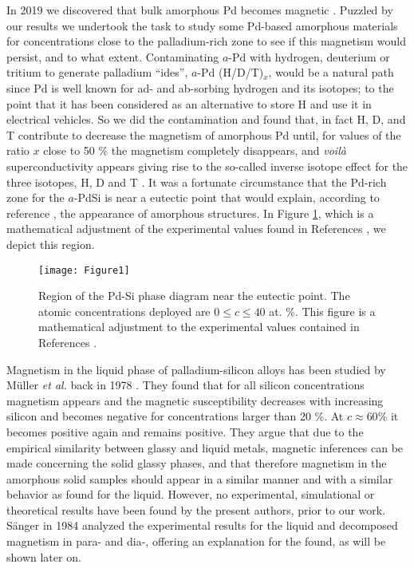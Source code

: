 \documentclass[fleqn,12pt]{wlscirep}
\begin{document}
In 2019 we discovered that bulk amorphous Pd becomes magnetic \cite{Rodriguez_2019}. Puzzled by our results we undertook the task to study some Pd-based amorphous materials for concentrations close to the palladium-rich zone to see if this magnetism would persist, and to what extent. Contaminating $a$-Pd with hydrogen, deuterium or tritium to generate palladium ``ides'', $a$-Pd (H/D/T)$_{x}$, would be a natural path since Pd is well known for ad- and ab-sorbing hydrogen and its isotopes; to the point that it has been considered as an alternative to store H and use it in electrical vehicles. So we did the contamination and found that, in fact H, D, and T contribute to decrease the magnetism of amorphous Pd until, for values of the ratio $x$ close to 50 \% the magnetism completely disappears, and \textit{voilà} superconductivity appears giving rise to the so-called inverse isotope effect for the three isotopes, H, D and T \cite{Rodriguez_supercond_2021}. It was a fortunate circumstance that the Pd-rich zone for the $a$-PdSi is near a eutectic point that would explain, according to reference \cite{Cohen_1961}, the appearance of amorphous structures. In Figure \ref{fig:Fig1}, which is a mathematical adjustment of the experimental values found in References \cite{Okamoto_1993, Baxi_1991, Massara_1993}, we depict this region.

\begin{figure}[ht]
\centering
\texttt{[image: Figure1]}
\caption{Region of the Pd-Si phase diagram near the eutectic point. The atomic concentrations deployed are $0 \leq c \leq 40$ at. \%. This figure is a mathematical adjustment to the experimental values contained in References \cite{Okamoto_1993, Baxi_1991, Massara_1993}.}
\label{fig:Fig1}
\end{figure}

Magnetism in the liquid phase of palladium-silicon alloys has been studied by M\"{u}ller \textit{et al.} back in 1978 \cite{Muller_1978}. They found that for all silicon concentrations magnetism appears and the magnetic susceptibility decreases with increasing silicon and becomes negative for concentrations larger than 20 \%. At $c \approx 60 \%$ it becomes positive again and remains positive. They argue that due to the empirical similarity between glassy and liquid metals, magnetic inferences can be made concerning the solid glassy phases, and that therefore magnetism in the amorphous solid samples should appear in a similar manner and with a similar behavior as found for the liquid. However, no experimental, simulational or theoretical results have been found by the present authors, prior to our work. S\"{a}nger \cite{Sanger_1984} in 1984 analyzed the experimental results for the liquid and decomposed magnetism in para- and dia-, offering an explanation for the found, as will be shown later on.
\end{document}

